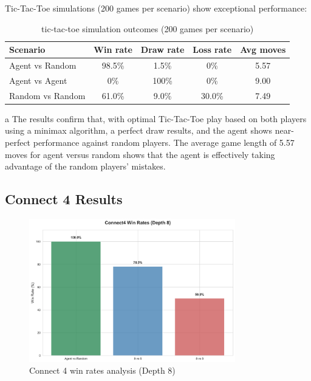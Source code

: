 \documentclass[12pt]{article}
\begin{document}
Tic-Tac-Toe simulations (200 games per scenario) show exceptional performance:
\begin{table}[H]
    \centering
    \begin{tabular}{lcccc}
        \toprule
        \textbf{Scenario} & \textbf{Win rate} & \textbf{Draw rate} & \textbf{Loss rate} & \textbf{Avg moves} \\
        \midrule
        Agent vs Random & 98.5\% & 1.5\% & 0\% & 5.57 \\
        Agent vs Agent & 0\% & 100\% & 0\% & 9.00 \\
        Random vs Random & 61.0\% & 9.0\% & 30.0\% & 7.49 \\
        \bottomrule
    \end{tabular}
    \caption{tic-tac-toe simulation outcomes (200 games per scenario)}
    \label{tab:tic_tac_toe_outcomes}
\end{table}
a
The results confirm that, with optimal Tic-Tac-Toe play based on both players using a minimax algorithm, a perfect draw results, and the agent shows near-perfect performance against random players. The average game length of 5.57 moves for agent versus random shows that the agent is effectively taking advantage of the random players' mistakes.

\subsection{Connect 4 Results}

\begin{figure}[H]
\centering
\includegraphics[width=0.8\textwidth]{output/images/connect4_win_rates_updated.png}
\caption{Connect 4 win rates analysis (Depth 8)}
\label{fig:connect4_win_rates}
\end{figure}
\end{document}

